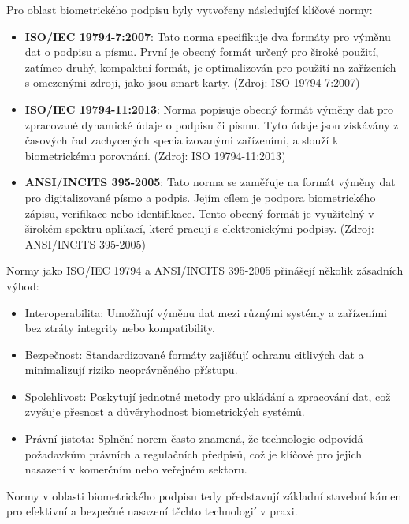 Pro oblast biometrického podpisu byly vytvořeny následující klíčové normy: %

\begin{itemize}
  \item{\textbf{ISO/IEC 19794-7:2007}: Tato norma specifikuje dva formáty pro výměnu dat o podpisu a písmu. První je obecný formát určený pro široké použití, zatímco druhý, kompaktní formát, je optimalizován pro použití na zařízeních s omezenými zdroji, jako jsou smart karty. (Zdroj: ISO 19794-7:2007)} %
  \item{\textbf{ISO/IEC 19794-11:2013}: Norma popisuje obecný formát výměny dat pro zpracované dynamické údaje o podpisu či písmu. Tyto údaje jsou získávány z časových řad zachycených specializovanými zařízeními, a slouží k biometrickému porovnání. (Zdroj: ISO 19794-11:2013)}%
  \item{\textbf{ANSI/INCITS 395-2005}: Tato norma se zaměřuje na formát výměny dat pro digitalizované písmo a podpis. Jejím cílem je podpora biometrického zápisu, verifikace nebo identifikace. Tento obecný formát je využitelný v širokém spektru aplikací, které pracují s elektronickými podpisy. (Zdroj: ANSI/INCITS 395-2005)}%
\end{itemize}

Normy jako ISO/IEC 19794 a ANSI/INCITS 395-2005 přinášejí několik zásadních výhod:%
\begin{itemize}
    \item{Interoperabilita: Umožňují výměnu dat mezi různými systémy a zařízeními bez ztráty integrity nebo kompatibility.}%
    \item{Bezpečnost: Standardizované formáty zajišťují ochranu citlivých dat a minimalizují riziko neoprávněného přístupu.}%
    \item{Spolehlivost: Poskytují jednotné metody pro ukládání a zpracování dat, což zvyšuje přesnost a důvěryhodnost biometrických systémů.}%
    \item{Právní jistota: Splnění norem často znamená, že technologie odpovídá požadavkům právních a regulačních předpisů, což je klíčové pro jejich nasazení v komerčním nebo veřejném sektoru.}%
\end{itemize}

Normy v oblasti biometrického podpisu tedy představují základní stavební kámen pro efektivní a bezpečné nasazení těchto technologií v praxi.%

